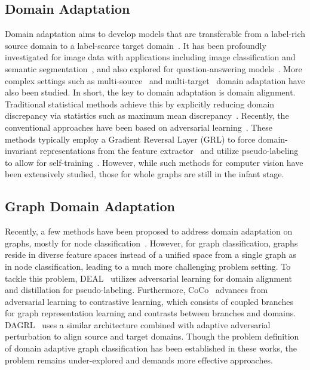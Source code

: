 \subsection{Domain Adaptation}
Domain adaptation aims to develop models that are transferable from a label-rich source domain to a label-scarce target domain~\cite{10.1007/978-3-642-15561-1_16,pmlr-v37-ganin15}. It has been profoundly investigated for image data with applications including image classification and semantic segmentation~\cite{Wang_Li_Ye_Long_Wang_2019, 9944086, csurka2021unsupervised}, and also explored for question-answering models~\cite{awadalla2022exploring,pmlr-v119-miller20a}. More complex settings such as multi-source~\cite{Ren_2022} and multi-target~\cite{roy2021curriculum} domain adaptation have also been studied. In short, the key to domain adaptation is domain alignment. Traditional statistical methods achieve this by explicitly reducing domain discrepancy via statistics such as maximum mean discrepancy~\cite{tzeng2014deep, pmlr-v37-long15}. Recently, the conventional approaches have been based on adversarial learning~\cite{ajakan2015domainadversarial, 10.5555/3326943.3327094, roy2021curriculum}. These methods typically employ a Gradient Reversal Layer (GRL) to force domain-invariant representations from the feature extractor~\cite{JMLR:v17:15-239} and utilize pseudo-labeling to allow for self-training~\cite{article}. However, while such methods for computer vision have been extensively studied, those for whole graphs are still in the infant stage.

\subsection{Graph Domain Adaptation}
Recently, a few methods have been proposed to address domain adaptation on graphs, mostly for node classification~\cite{pmlr-v202-liu23u, you2023graph, ijcai2019p0606, 10.1145/3366423.3380219, NEURIPS2021_eb55e369}. However, for graph classification, graphs reside in diverse feature spaces instead of a unified space from a single graph as in node classification, leading to a much more challenging problem setting. To tackle this problem, DEAL~\cite{10.1145/3503161.3548012} utilizes adversarial learning for domain alignment and distillation for pseudo-labeling. Furthermore, CoCo~\cite{pmlr-v202-yin23a} advances from adversarial learning to contrastive learning, which consists of coupled branches for graph representation learning and contrasts between branches and domains. DAGRL~\cite{luo2023domainadaptivegraphclassification} uses a similar architecture combined with adaptive adversarial perturbation to align source and target domains. Though the problem definition of domain adaptive graph classification has been established in these works, the problem remains under-explored and demands more effective approaches.